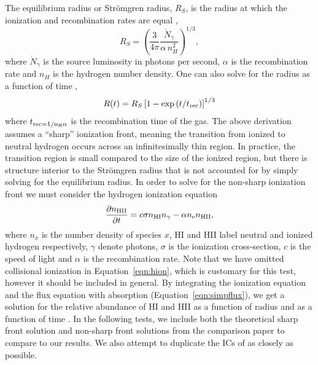 \documentclass[fleq,usenatbib]{mnras}
\newcommand{\strom}{Str\"omgren}
\begin{document}
{The equilibrium radius or \strom{} radius, $R_S$, is the radius at which the 
ionization and recombination rates are equal \citep[e.g.][]{tielens05},
\begin{equation}
R_S = \left(\frac{3}{4\pi}\frac{\dot{N}_\gamma}{\alpha\, n^2_{H}}\right)^{1/3},
\end{equation}
where $\dot{N}_\gamma$ is the source luminosity in photons per second, 
$\alpha$ is the recombination rate and $n_H$ is the hydrogen number density. 
One can also solve for the radius as a function of time 
\citep[e.g.][]{spitzer78},
\begin{equation}\label{eqn:stromtime}
R(t) = R_S\left[1-\exp\left(t/t_{\rm rec}\right)\right]^{1/3}
\end{equation}
where $t_{\rm rec = 1/{n_H \alpha}}$ is the recombination time of the 
gas. The above derivation assumes a ``sharp'' ionization front, meaning the 
transition from ionized to neutral hydrogen occurs across an infinitesimally 
thin region. In practice, the transition region is small compared to the size 
of the ionized region, but there is structure interior to the \strom{} radius 
that is not accounted for by simply solving for the equilibrium radius. In 
order to solve for the non-sharp ionization front we must consider the 
hydrogen ionization equation
\begin{equation}\label{eqn:hion}
\frac{\partial n_{\rm HII}}{\partial t} = c \sigma n_{\rm HI} n_{\gamma} - 
\alpha n_{\rm e} n_{\rm HII},
\end{equation}
where $n_x$ is the number density of species $x$, HI and HII label neutral 
and ionized hydrogen respectively, $\gamma$ denote photons, $\sigma$ is the 
ionization cross-section, $c$ is the speed of light and $\alpha$ is the 
recombination rate. Note that we have omitted collisional ionization in 
Equation~\ref{eqn:hion}, which is customary for this test, however it 
should be included in general. By integrating the ionization equation and the 
flux equation with absorption (Equation~\ref{eqn:simpflux}), we get a solution 
for the relative abundance of HI and HII as a function of radius and as a 
function of time \citep{osterbrockFerland2006}. In the following tests, we 
include both the theoretical sharp front solution and non-sharp front 
solutions from the \cite{ilievEt06} comparison paper to compare to our 
results. We also attempt to duplicate the ICs of 
\cite{ilievEt06} as closely as possible.

}
\end{document}
